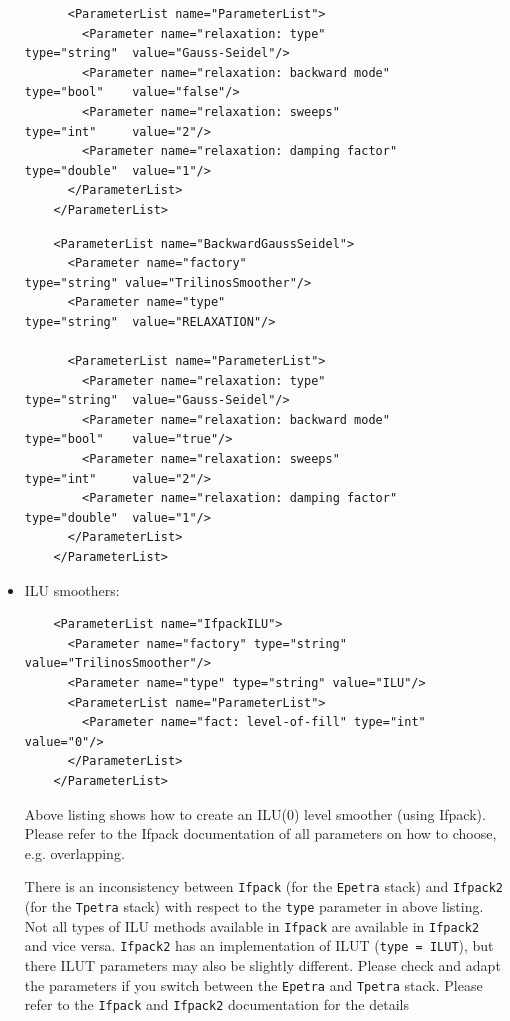 \documentclass[10pt,fleqn]{book}
\begin{document}
\begin{itemize}
\begin{lstlisting}
      <ParameterList name="ParameterList">
        <Parameter name="relaxation: type"                  type="string"  value="Gauss-Seidel"/>
        <Parameter name="relaxation: backward mode"         type="bool"    value="false"/>
        <Parameter name="relaxation: sweeps"                type="int"     value="2"/>
        <Parameter name="relaxation: damping factor"        type="double"  value="1"/>
      </ParameterList>
    </ParameterList>
\end{lstlisting}

\begin{lstlisting}
    <ParameterList name="BackwardGaussSeidel">
      <Parameter name="factory"                        type="string" value="TrilinosSmoother"/>
      <Parameter name="type"                                type="string"  value="RELAXATION"/>

      <ParameterList name="ParameterList">
        <Parameter name="relaxation: type"                  type="string"  value="Gauss-Seidel"/>
        <Parameter name="relaxation: backward mode"         type="bool"    value="true"/>
        <Parameter name="relaxation: sweeps"                type="int"     value="2"/>
        <Parameter name="relaxation: damping factor"        type="double"  value="1"/>
      </ParameterList>
    </ParameterList>
\end{lstlisting}
\item ILU smoothers:
\begin{lstlisting}
    <ParameterList name="IfpackILU">
      <Parameter name="factory" type="string" value="TrilinosSmoother"/>
      <Parameter name="type" type="string" value="ILU"/>
      <ParameterList name="ParameterList">
        <Parameter name="fact: level-of-fill" type="int" value="0"/>
      </ParameterList>
    </ParameterList>
\end{lstlisting}
Above listing shows how to create an ILU(0) level smoother (using Ifpack). Please refer to the Ifpack documentation of all parameters on how to choose, e.g. overlapping.

\begin{remark}
There is an inconsistency between \texttt{Ifpack} (for the \texttt{Epetra} stack) and \texttt{Ifpack2} (for the \texttt{Tpetra} stack) with respect to the \texttt{type} parameter in above listing. Not all types of ILU methods available in \texttt{Ifpack} are available in \texttt{Ifpack2} and vice versa. \texttt{Ifpack2} has an implementation of ILUT (\texttt{type = ILUT}), but there ILUT parameters may also be slightly different. Please check and adapt the parameters if you switch between the \texttt{Epetra} and \texttt{Tpetra} stack. Please refer to the \texttt{Ifpack} and \texttt{Ifpack2} documentation for the details
\end{remark}


\end{itemize}
\end{document}
